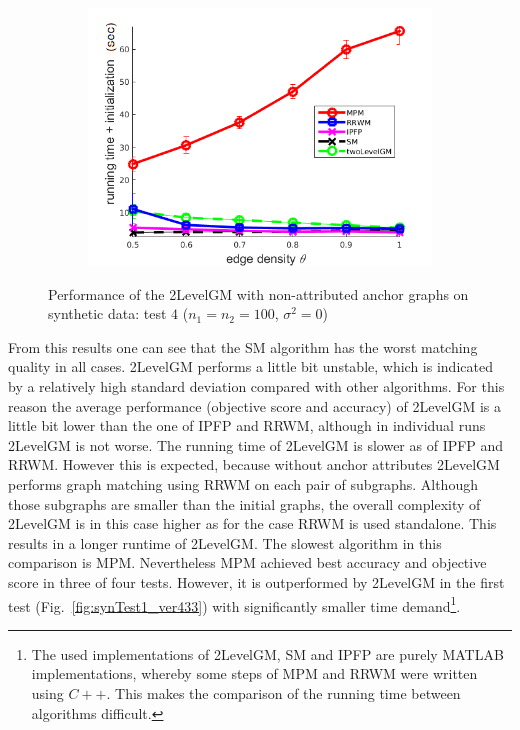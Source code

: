 \begin{figure}
\begin{subfigure}[b]{0.33\textwidth}
			\includegraphics[scale=0.33]{"chapter3/fig/SyntheticTest/no_descr/Results_v4.3.3/Test4/time_summary_avg10t"} 
		\end{subfigure} 	
	\caption[Performance of the 2LevelGM with non-attributed anchor graphs on synthetic data (test $4$)]{Performance of the 2LevelGM with non-attributed anchor graphs on synthetic data: test $4$ ($n_1=n_2=100$, $\sigma^2=0$)}
	\label{fig:synTest4_ver433}
\end{figure}

From this results one can see that the SM algorithm has the worst matching quality in all cases. 2LevelGM performs a little bit unstable, which is indicated by a relatively high standard deviation compared with other algorithms. For this reason the average performance (objective score and accuracy) of 2LevelGM is a little bit lower than the one of IPFP and RRWM, although in individual runs 2LevelGM is not worse. The running time of 2LevelGM is slower as of IPFP and RRWM. However this is expected, because without anchor attributes 2LevelGM performs graph matching using RRWM on each pair of subgraphs. Although those subgraphs are smaller than the initial graphs, the overall complexity of 2LevelGM is in this case higher as for the case RRWM is used standalone. This results in a longer runtime of 2LevelGM.
The slowest algorithm in this comparison is MPM. Nevertheless MPM achieved  best accuracy and objective score in three of four tests. However, it is outperformed by 2LevelGM in the first test (Fig.~\ref{fig:synTest1_ver433}) with significantly smaller time demand\footnote{The used implementations of 2LevelGM, SM and IPFP are purely MATLAB implementations, whereby some steps of MPM and RRWM were written using $C++$. This makes the comparison of the running time between algorithms difficult.}.

